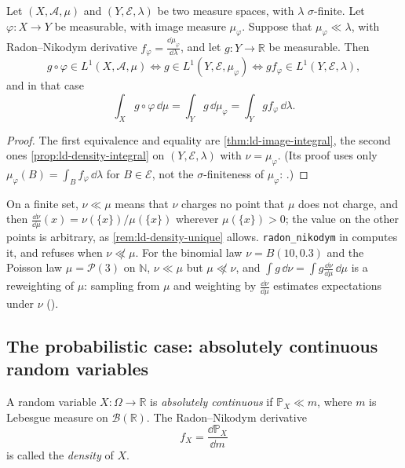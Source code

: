 \begin{corollary}\label{cor:ld-image-density}
Let $(X,\mathcal A,\mu)$ and $(Y,\mathcal E,\lambda)$ be two measure spaces, with $\lambda$
$\sigma$-finite. Let $\varphi:X\to Y$ be measurable, with image measure $\mu_\varphi$. Suppose that
$\mu_\varphi\ll\lambda$, with Radon--Nikodym derivative $f_\varphi=\frac{\dd\mu_\varphi}{\dd\lambda}$,
and let $g:Y\to\mathbb R$ be measurable. Then
\[
  g\circ\varphi\in L^1(X,\mathcal A,\mu)\iff g\in L^1(Y,\mathcal E,\mu_\varphi)\iff gf_\varphi\in L^1(Y,\mathcal E,\lambda),
\]
and in that case
\[
  \int_Xg\circ\varphi\,\dd\mu=\int_Yg\,\dd\mu_\varphi=\int_Ygf_\varphi\,\dd\lambda .
\]
\end{corollary}

\begin{proof}
The first equivalence and equality are \cref{thm:ld-image-integral}, the second ones
\cref{prop:ld-density-integral} on $(Y,\mathcal E,\lambda)$ with $\nu=\mu_\varphi$. (Its proof
uses only $\mu_\varphi(B)=\int_Bf_\varphi\,\dd\lambda$ for $B\in\mathcal E$, not the
$\sigma$-finiteness of $\mu_\varphi$: .)
\end{proof}

\begin{remark}[Computational]\label{rem:ld-rn-code}
On a finite set, $\nu\ll\mu$ means that $\nu$ charges no point that $\mu$ does not charge, and
then $\frac{\dd\nu}{\dd\mu}(x)=\nu(\{x\})/\mu(\{x\})$ wherever $\mu(\{x\})>0$; the value on the other
points is arbitrary, as \cref{rem:ld-density-unique} allows. \texttt{radon\_nikodym} in
 computes it, and refuses when $\nu\not\ll\mu$. For the
binomial law $\nu=B(10,0.3)$ and the Poisson law $\mu=\mathcal P(3)$ on $\mathbb N$, $\nu\ll\mu$
but $\mu\not\ll\nu$, and $\int g\,\dd\nu=\int g\frac{\dd\nu}{\dd\mu}\,\dd\mu$ is a reweighting of
$\mu$: sampling from $\mu$ and weighting by $\frac{\dd\nu}{\dd\mu}$ estimates expectations under
$\nu$ ().
\end{remark}

\subsection{The probabilistic case: absolutely continuous random
variables}\label{sec:ld-ac-rv}

\begin{definition}\label{def:ld-ac-rv}
A random variable $X:\Omega\to\mathbb R$ is \emph{absolutely continuous} if
$\mathbb P_X\ll m$, where $m$ is Lebesgue measure on $\mathcal B(\mathbb R)$. The
Radon--Nikodym derivative
\[
  f_X=\frac{\dd\mathbb P_X}{\dd m}
\]
is called the \emph{density} of $X$.
\end{definition}

